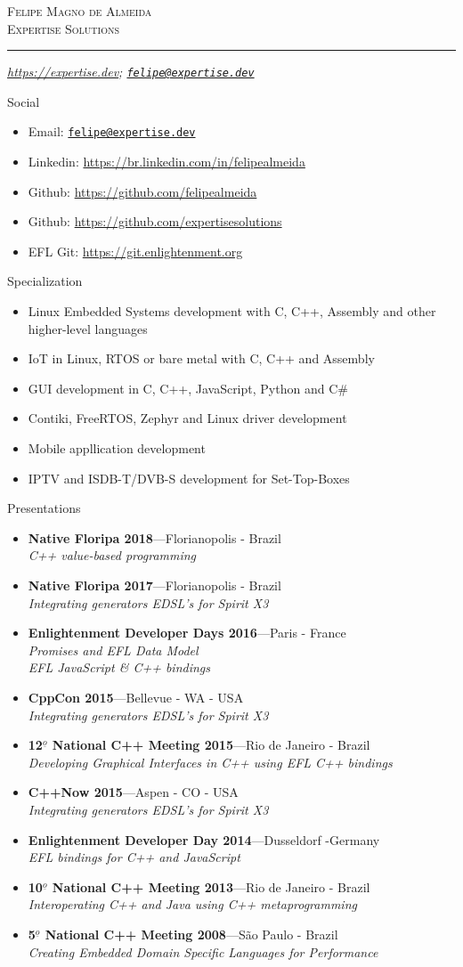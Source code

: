 \documentclass[10pt,oneside]{article}
\makeatletter
\newcommand{\name}{Felipe Magno de Almeida\\Expertise Solutions}
\newcommand{\addr}{}
\newcommand{\phone}{\url{https://expertise.dev}}
\newcommand{\email}{\href{mailto:felipe@expertise.dev}{\nolinkurl{felipe@expertise.dev}}}
\newcommand{\bigname}[1]{
	\begin{center}\fontfamily{phv}\selectfont\Huge\scshape#1\end{center}
}
\newenvironment{ressection}[1]{
	\vspace{4pt}
	{\fontfamily{phv}\selectfont\Large#1}
	\begin{itemize}
	\vspace{3pt}
}{
	\end{itemize}
}
\newcommand{\resitem}[1]{
	\vspace{-4pt}
	\item \begin{flushleft} #1 \end{flushleft}
}
\newcommand{\resbigitem}[3]{
	\vspace{-5pt}
	\item
	\textbf{#1}---#2 \\
	\textit{#3}
}
\makeatother
\begin{document}
 \selectfont

\bigname{\name}

\vspace{-8pt} \rule{\textwidth}{1pt}

\vspace{-1pt} {\small\itshape \addr \hfill \phone; \email}

\vspace{8 pt}

\begin{ressection}{Social}
  \resitem{Email: \href{mailto:felipe@expertise.dev}{\nolinkurl{felipe@expertise.dev}}}
  \resitem{Linkedin: \url{https://br.linkedin.com/in/felipealmeida}}
  \resitem{Github: \url{https://github.com/felipealmeida}}
  \resitem{Github: \url{https://github.com/expertisesolutions}}
  \resitem{EFL Git: \url{https://git.enlightenment.org}}
\end{ressection}


\begin{ressection}{Specialization}
        \resitem{Linux Embedded Systems development with C, C++,
          Assembly and other higher-level languages}
        \resitem{IoT in Linux, RTOS or bare metal with C, C++ and
          Assembly}
	\resitem{GUI development in C, C++, JavaScript, Python and C\#}
        \resitem{Contiki, FreeRTOS, Zephyr and Linux driver development}
        \resitem{Mobile appllication development}
        \resitem{IPTV and ISDB-T/DVB-S development for Set-Top-Boxes}
\end{ressection}


\begin{ressection}{Presentations}
  \resbigitem{Native Floripa 2018}{Florianopolis -
    Brazil}{C++ value-based programming}
  \resbigitem{Native Floripa 2017}{Florianopolis -
    Brazil}{Integrating generators EDSL's for Spirit X3}
  \resbigitem{Enlightenment Developer Days 2016}{Paris -
    France}{Promises and EFL Data Model \\ EFL JavaScript \& C++ bindings}
  \resbigitem{CppCon 2015}{Bellevue - WA -  USA}{Integrating generators EDSL's for Spirit X3}
  \resbigitem{12$^{\underline{o}}$ National C++ Meeting 2015}{Rio de Janeiro -
    Brazil}{Developing Graphical Interfaces in C++ using EFL C++ bindings}
  \resbigitem{C++Now 2015}{Aspen - CO - USA}{Integrating generators EDSL's for Spirit X3}
  \resbigitem{Enlightenment Developer Day 2014}{Dusseldorf -Germany}{EFL bindings for C++
    and JavaScript}
  \resbigitem{10$^{\underline{o}}$ National C++ Meeting 2013}{Rio de Janeiro -
    Brazil}{Interoperating C++ and Java using C++ metaprogramming}
  \resbigitem{5$^{\underline{o}}$ National C++ Meeting 2008}{São Paulo -
    Brazil}{Creating Embedded Domain Specific Languages for Performance}
\end{ressection}
\end{document}

